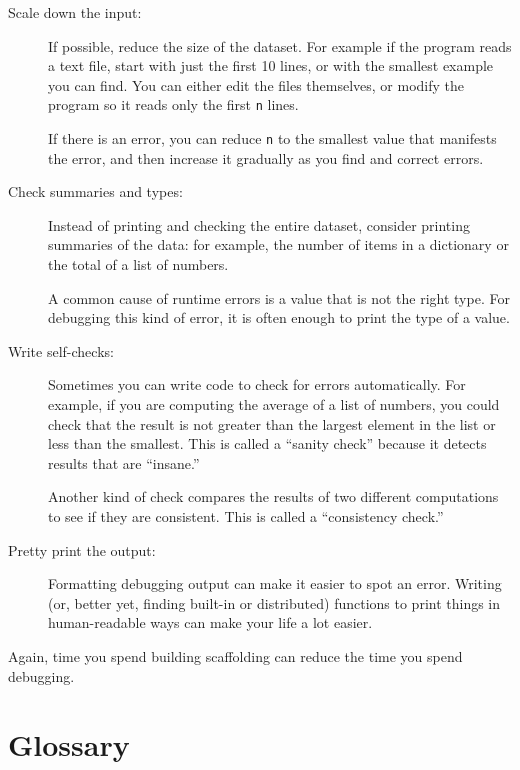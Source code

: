 \documentclass[10pt]{book}
\begin{document}
\begin{description}

\item[Scale down the input:] If possible, reduce the size of the
dataset.  For example if the program reads a text file, start with
just the first 10 lines, or with the smallest example you can find.
You can either edit the files themselves, or modify the
program so it reads only the first {\tt n} lines.

If there is an error, you can reduce {\tt n} to the smallest
value that manifests the error, and then increase it gradually
as you find and correct errors.

\item[Check summaries and types:] Instead of printing and checking the
entire dataset, consider printing summaries of the data: for example,
the number of items in a dictionary or the total of a list of numbers.

A common cause of runtime errors is a value that is not the right
type.  For debugging this kind of error, it is often enough to print
the type of a value.

\item[Write self-checks:]  Sometimes you can write code to check
for errors automatically.  For example, if you are computing the
average of a list of numbers, you could check that the result is
not greater than the largest element in the list or less than
the smallest.  This is called a ``sanity check'' because it detects
results that are ``insane.''


Another kind of check compares the results of two different
computations to see if they are consistent.  This is called a
``consistency check.''

\item[Pretty print the output:] Formatting debugging output
can make it easier to spot an error. Writing (or, better yet,
finding built-in or distributed) functions to print things in
human-readable ways can make your life a lot easier.


\end{description}

Again, time you spend building scaffolding can reduce
the time you spend debugging.


\section{Glossary}
\end{document}
